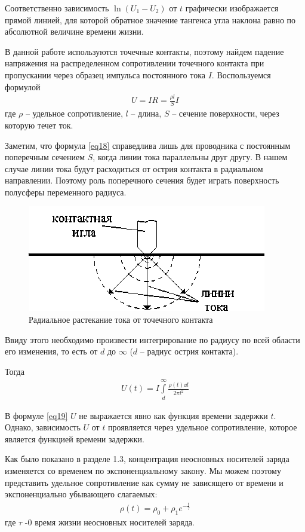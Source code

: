 \documentclass[a4paper,12pt]{article}
\let\tempint\int
\renewcommand{\int}{\tempint\limits}
\begin{document}
Соответственно зависимость $\ln(U_1-U_2)$ от $t$ графически изображается прямой линией, для которой обратное значение тангенса угла наклона равно по абсолютной величине времени жизни.

В данной работе используются точечные контакты, поэтому найдем падение напряжения на распределенном сопротивлении точечного контакта при пропускании через образец импульса постоянного тока $I$. Воспользуемся формулой
\begin{gather}
	\label{eq18}
	U=I R=\frac{\rho l}{S} I
\end{gather}
где $\rho$ -- удельное сопротивление, $l$ -- длина, $S$ -- сечение поверхности, через которую течет ток. 

Заметим, что формула \eqref{eq18} справедлива лишь для проводника с постоянным поперечным сечением $S$, когда линии тока параллельны друг другу. 
В нашем случае линии тока будут расходиться от острия контакта в радиальном направлении. Поэтому роль поперечного сечения будет играть поверхность полусферы переменного радиуса.
\begin{figure}[H]
	\centering
	\includegraphics[]{11}
	\caption{Радиальное растекание тока от точечного контакта}
	\label{fig:figure10}
\end{figure}

Ввиду этого необходимо произвести интегрирование по радиусу по всей области его изменения, то есть от $d$ до $\infty$ ($d$ -- радиус острия контакта). 

Тогда
\begin{gather}
	\label{eq19}
	U(t)=I \int_{d}^{\infty} \frac{\rho(t) \dd l}{2 \pi l^{2}}
\end{gather}

В формуле \eqref{eq19} $U$ не выражается явно как функция времени задержки $t$. Однако, зависимость $U$ от $t$ проявляется через удельное сопротивление, которое является функцией времени задержки.

Как было показано в разделе 1.3, концентрация неосновных носителей заряда изменяется со временем по экспоненциальному закону. Мы можем поэтому представить удельное сопротивление как сумму не зависящего от времени и экспоненциально убывающего слагаемых: 
\begin{gather}
	\label{eq20}
	\rho(t)=\rho_{0}+\rho_{1} e^{-\frac{t}{\tau}}
\end{gather}
где $\tau$ -0 время жизни неосновных носителей заряда.
\end{document}
